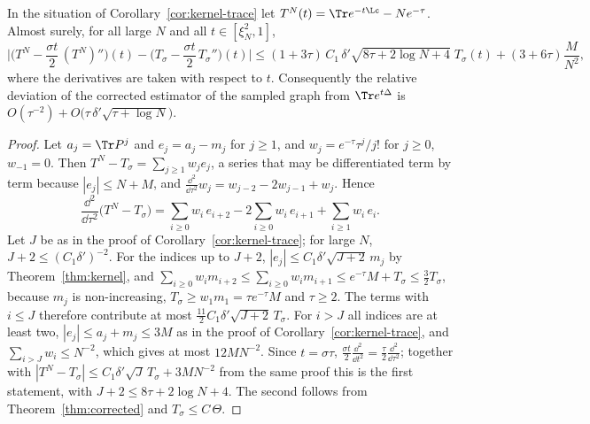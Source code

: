 \begin{corollary}\label{cor:kernel-corrected}
In the situation of Corollary~\ref{cor:kernel-trace} let $T^N(t)=\Tr e^{-t\Lc}-Ne^{-\tau}$. Almost surely, for all large $N$ and all $t\in[\xi_N^2,1]$,
\[
\Big|\Big(T^N-\frac{\sigma t}2\,(T^N)''\Big)(t)-\Big(T_\sigma-\frac{\sigma t}2\,T_\sigma''\Big)(t)\Big|\le(1+3\tau)\,C_1\,\delta'\sqrt{8\tau+2\log N+4}\;T_\sigma(t)+(3+6\tau)\frac M{N^2},
\]
where the derivatives are taken with respect to $t$. Consequently the relative deviation of the corrected estimator of the sampled graph from $\Tr e^{t\Delta}$ is $O(\tau^{-2})+O\big(\tau\,\delta'\sqrt{\tau+\log N}\big)$.
\end{corollary}

\begin{proof}
Let $a_j=\Tr P^j$ and $e_j=a_j-m_j$ for $j\ge1$, and $w_j=e^{-\tau}\tau^j/j!$ for $j\ge0$, $w_{-1}=0$. Then $T^N-T_\sigma=\sum_{j\ge1}w_je_j$, a series that may be differentiated term by term because $|e_j|\le N+M$, and $\frac{\dd^2}{\dd\tau^2}w_j=w_{j-2}-2w_{j-1}+w_j$. Hence
\[
\frac{\dd^2}{\dd\tau^2}\big(T^N-T_\sigma\big)=\sum_{i\ge0}w_i\,e_{i+2}-2\sum_{i\ge0}w_i\,e_{i+1}+\sum_{i\ge1}w_i\,e_i .
\]
Let $J$ be as in the proof of Corollary~\ref{cor:kernel-trace}; for large $N$, $J+2\le(C_1\delta')^{-2}$. For the indices up to $J+2$, $|e_j|\le C_1\delta'\sqrt{J+2}\,m_j$ by Theorem~\ref{thm:kernel}, and $\sum_{i\ge0}w_im_{i+2}\le\sum_{i\ge0}w_im_{i+1}\le e^{-\tau}M+T_\sigma\le\frac32T_\sigma$, because $m_j$ is non-increasing, $T_\sigma\ge w_1m_1=\tau e^{-\tau}M$ and $\tau\ge2$. The terms with $i\le J$ therefore contribute at most $\frac{11}2C_1\delta'\sqrt{J+2}\,T_\sigma$. For $i>J$ all indices are at least two, $|e_j|\le a_j+m_j\le3M$ as in the proof of Corollary~\ref{cor:kernel-trace}, and $\sum_{i>J}w_i\le N^{-2}$, which gives at most $12MN^{-2}$. Since $t=\sigma\tau$, $\frac{\sigma t}2\frac{\dd^2}{\dd t^2}=\frac\tau2\frac{\dd^2}{\dd\tau^2}$; together with $|T^N-T_\sigma|\le C_1\delta'\sqrt J\,T_\sigma+3MN^{-2}$ from the same proof this is the first statement, with $J+2\le8\tau+2\log N+4$. The second follows from Theorem~\ref{thm:corrected} and $T_\sigma\le C\,\Theta$.
\end{proof}

